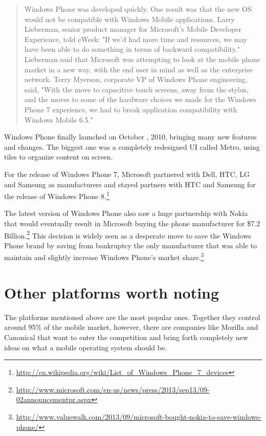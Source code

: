 \begin{quotation}
Windows Phone was developed quickly. One result was that the new \ac{OS} would not be compatible with Windows Mobile applications. Larry Lieberman, senior product manager for Microsoft's Mobile Developer Experience, told eWeek: "If we'd had more time and resources, we may have been able to do something in terms of backward compatibility." Lieberman said that Microsoft was attempting to look at the mobile phone market in a new way, with the end user in mind as well as the enterprise network. Terry Myerson, corporate VP of Windows Phone engineering, said, "With the move to capacitive touch screens, away from the stylus, and the moves to some of the hardware choices we made for the Windows Phone 7 experience, we had to break application compatibility with Windows Mobile 6.5."
\cite{wikipedia:windows_phone}
\end{quotation}

Windows Phone finally launched on October , 2010, bringing many new features and changes. The biggest one was a completely redesigned \ac{UI} called Metro, using tiles to organize content on screen.  

For the release of Windows Phone 7, Microsoft partnered with Dell, HTC, LG and Samsung as manufacturers and stayed partners with HTC and Samsung for the release of Windows Phone 8.\footnote{\url{http://en.wikipedia.org/wiki/List_of_Windows_Phone_7_devices}}


The latest version of Windows Phone also saw a huge partnership with Nokia that would eventually result in Microsoft buying the phone manufacturer for \$7.2 Billion.\footnote{\url{http://www.microsoft.com/en-us/news/press/2013/sep13/09-02announcementpr.aspx}} This decision is widely seen as a desperate move to save the Windows Phone brand by saving from bankruptcy the only manufacturer that was able to maintain and slightly increase Windows Phone's market share.\footnote{\url{http://www.valuewalk.com/2013/09/microsoft-bought-nokia-to-save-windows-phone/}}  
 






\section{Other platforms worth noting}
The platforms mentioned above are the most popular ones. Together they control around 95\% of the mobile market, however, there are companies like Mozilla and Canonical that want to enter the competition and bring forth completely new ideas on what a mobile operating system should be.

